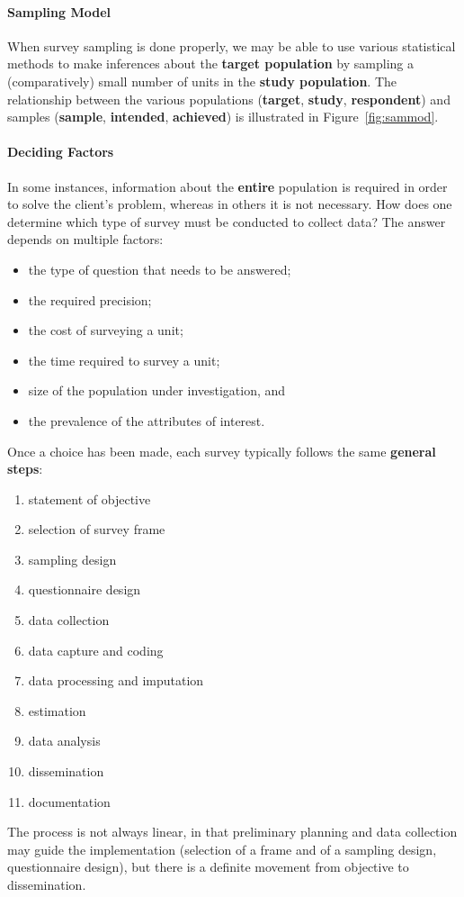 \paragraph{Sampling Model}
When survey sampling is done properly, we may be able to use various statistical methods to make inferences about the \textbf{target population} by sampling a (comparatively) small number of units in the \textbf{study population}. The relationship between the various populations (\textbf{target}, \textbf{study}, \textbf{respondent}) and samples (\textbf{sample}, \textbf{intended}, \textbf{achieved}) is illustrated in Figure~\ref{fig:sammod}. 
\paragraph{Deciding Factors} In some instances, information about the \textbf{entire} population is required in order to solve the client's problem, whereas in others it is not necessary.  How does one determine which type of survey must be conducted to collect data? The answer depends on multiple factors: 
\begin{itemize}[noitemsep]
    \item the type of question that needs to be answered;
\item the required precision;
\item the cost of surveying a unit;
\item the time required to survey a unit; \item size of the population under investigation, and 
\item the prevalence of the attributes of interest.
\end{itemize}
Once a choice has been made, each survey typically follows the same \textbf{general steps}:
\begin{enumerate}[noitemsep]
    \item statement of objective
    \item selection of survey frame
    \item sampling design
    \item questionnaire design
    \item data collection
    \item data capture and coding
    \item data processing and imputation
    \item estimation
    \item data analysis
    \item dissemination
    \item documentation
\end{enumerate}
The process is not always linear, in that preliminary planning and data collection may guide the implementation (selection of a frame and of a sampling design, questionnaire design), but there is a definite movement from objective to dissemination.   
